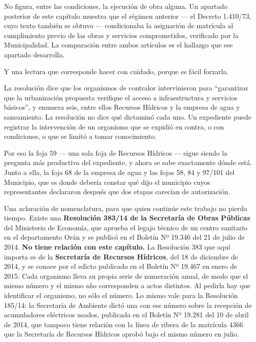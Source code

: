 No figura, entre las condiciones, la ejecución de obra alguna. Un apartado posterior de este capítulo muestra que el régimen anterior --- el Decreto 1.410/73, cuyo texto también se obtuvo --- condicionaba la asignación de matrícula al cumplimiento previo de las obras y servicios comprometidos, verificado por la Municipalidad. La comparación entre ambos artículos es el hallazgo que ese apartado desarrolla.

Y una lectura que corresponde hacer con cuidado, porque es fácil forzarla.

La resolución dice que los organismos de contralor intervinieron para ``garantizar que la urbanización propuesta verifique el acceso a infraestructura y servicios básicos'', y enumera seis, entre ellos Recursos Hídricos y la empresa de agua y saneamiento. La resolución no dice qué dictaminó cada uno. Un expediente puede registrar la intervención de un organismo que se expidió en contra, o con condiciones, o que se limitó a tomar conocimiento.

Por eso la foja 59 --- una sola foja de Recursos Hídricos --- sigue siendo la pregunta más productiva del expediente, y ahora se sabe exactamente dónde está. Junto a ella, la foja 68 de la empresa de agua y las fojas 58, 84 y 97/101 del Municipio, que es donde debería constar qué dijo el municipio cuyos representantes declararon después que dos etapas carecían de autorización.

Una aclaración de nomenclatura, para que quien continúe este trabajo no pierda tiempo. Existe una \textbf{Resolución 383/14 de la Secretaría de Obras Públicas} del Ministerio de Economía, que aprueba el legajo técnico de un centro sanitario en el departamento Orán y se publicó en el Boletín Nº 19.346 del 21 de julio de 2014. \textbf{No tiene relación con este capítulo.} La Resolución 383 que aquí importa es de la \textbf{Secretaría de Recursos Hídricos}, del 18 de diciembre de 2014, y se conoce por el edicto publicado en el Boletín Nº 19.467 en enero de 2015. Cada organismo lleva su propia serie de numeración anual, de modo que el mismo número y el mismo año corresponden a actos distintos. Al pedirla hay que identificar el organismo, no sólo el número. Lo mismo vale para la Resolución 185/14: la Secretaría de Ambiente dictó una con ese número sobre la recepción de acumuladores eléctricos usados, publicada en el Boletín Nº 19.281 del 10 de abril de 2014, que tampoco tiene relación con la línea de ribera de la matrícula 4366 que la Secretaría de Recursos Hídricos aprobó bajo el mismo número en julio.

